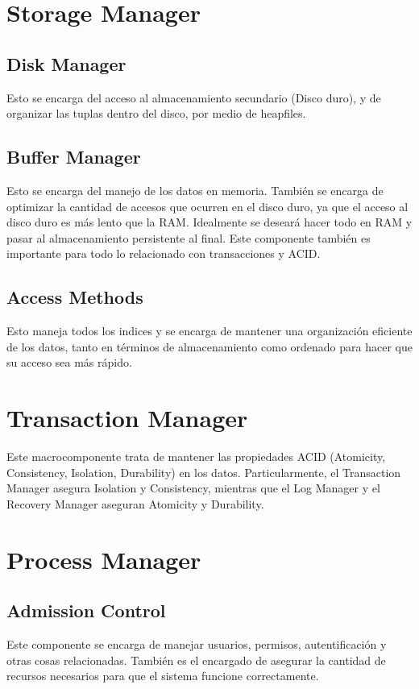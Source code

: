 \section{Storage Manager}
\subsection{Disk Manager}
Esto se encarga del acceso al almacenamiento secundario (Disco duro), y de organizar las tuplas dentro del disco, por medio de heapfiles.

\subsection{Buffer Manager}
Esto se encarga del manejo de los datos en memoria. También se encarga de optimizar la cantidad de accesos que ocurren en el disco duro, ya que el acceso al disco duro es más lento que la RAM. Idealmente se deseará hacer todo en RAM y pasar al almacenamiento persistente al final. Este componente también es importante para todo lo relacionado con transacciones y ACID.

\subsection{Access Methods}
Esto maneja todos los indices y se encarga de mantener una organización eficiente de los datos, tanto en términos de almacenamiento como ordenado para hacer que su acceso sea más rápido.

\section{Transaction Manager}
Este macrocomponente trata de mantener las propiedades ACID (Atomicity, Consistency, Isolation, Durability) en los datos. Particularmente, el Transaction Manager asegura Isolation y Consistency, mientras que el Log Manager y el Recovery Manager aseguran Atomicity y Durability.

\section{Process Manager}
\subsection{Admission Control}
Este componente se encarga de manejar usuarios, permisos, autentificación y otras cosas relacionadas. También es el encargado de asegurar la cantidad de recursos necesarios para que el sistema funcione correctamente.

